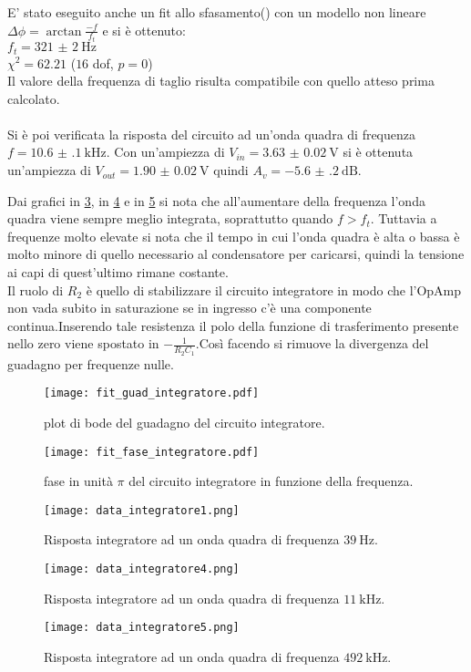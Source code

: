 E' stato eseguito anche un fit allo sfasamento() con un modello non lineare $\Delta \phi= \arctan{\frac{-f}{f_t}}$ e si è ottenuto:\\
$f_t= \SI{321(2)}{\Hz}$\\
$\chi^2=62.21$ ($16$ dof, $p = 0$)\\
Il valore della frequenza di taglio risulta compatibile con quello atteso prima calcolato.\\
\\
Si è poi verificata la risposta del circuito ad un'onda quadra di frequenza $f= \SI{10.6(1)}{\kHz}$. Con un'ampiezza di $V_{in}=\SI{3.63(2)}{\V}$ si è ottenuta un'ampiezza di $V_{out}=\SI{1.90(2)}{\V}$ quindi $A_v=\SI{-5.6(2)}{\dB}$.

Dai grafici in \ref{f:integ1}, in \ref{f:integ3} e in \ref{f:integ5} si nota che all'aumentare della frequenza l'onda quadra viene sempre meglio integrata, soprattutto quando $f> f_t$. Tuttavia a frequenze molto elevate si nota che il tempo in cui l'onda quadra è alta o bassa è molto minore di quello necessario al condensatore per caricarsi, quindi la tensione ai capi di quest'ultimo rimane costante. \\
Il ruolo di $R_2$ è quello di stabilizzare il circuito integratore in modo che l'OpAmp non vada subito in saturazione se in ingresso c'è una componente continua.Inserendo tale resistenza il polo della funzione di trasferimento presente nello zero viene spostato in $-\frac{1}{R_2C_1}$.Così facendo si rimuove la divergenza del guadagno per frequenze nulle.

\begin{figure}[h]
	\centering
	\texttt{[image: fit\_guad\_integratore.pdf]}
	\caption{plot di bode del guadagno del circuito integratore.}
	\label{f:guad_integ}
\end{figure}

\begin{figure}[h]
	\centering
	\texttt{[image: fit\_fase\_integratore.pdf]}
	\caption{fase in unità $\pi$ del circuito integratore in funzione della frequenza.}
	\label{f:fase_integ}
\end{figure}

\begin{figure}[h]
	\centering
	\texttt{[image: data\_integratore1.png]}
	\caption{Risposta integratore ad un onda quadra di frequenza $\SI{39}{\Hz}$.}
	\label{f:integ1}
\end{figure}

\begin{figure}[h]
	\centering
	\texttt{[image: data\_integratore4.png]}
	\caption{Risposta integratore ad un onda quadra di frequenza $\SI{11}{\kHz}$.}
	\label{f:integ3}
\end{figure}	

\begin{figure}[h]
	\centering
	\texttt{[image: data\_integratore5.png]}
	\caption{Risposta integratore ad un onda quadra di frequenza $\SI{492}{\kHz}$.}
	\label{f:integ5}
\end{figure}